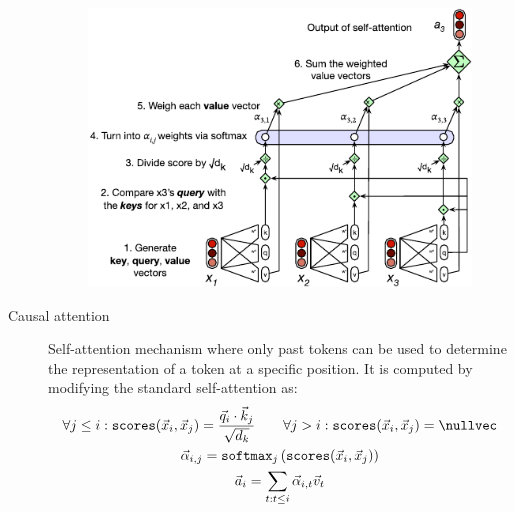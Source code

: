 \begin{description}
        \begin{figure}[H]
            \centering
            \includegraphics[width=0.6\linewidth]{./img/_self_attention.pdf}
        \end{figure}


    \item[Causal attention] 
        Self-attention mechanism where only past tokens can be used to determine the representation of a token at a specific position. It is computed by modifying the standard self-attention as:
        \[
            \begin{gathered}
                \forall j \leq i: \texttt{scores}(\vec{x}_i, \vec{x}_j) = \frac{\vec{q}_i \cdot \vec{k}_j}{\sqrt{d_k}} \qquad
                \forall j > i: \texttt{scores}(\vec{x}_i, \vec{x}_j) = \nullvec \\
                \vec{\alpha}_{i,j} = \texttt{softmax}_j\left( \texttt{scores}(\vec{x}_i, \vec{x}_j) \right) \\
                \vec{a}_i = \sum_{t: t \leq i} \vec{\alpha}_{i,t} \vec{v}_t
            \end{gathered}
        \]
\end{description}